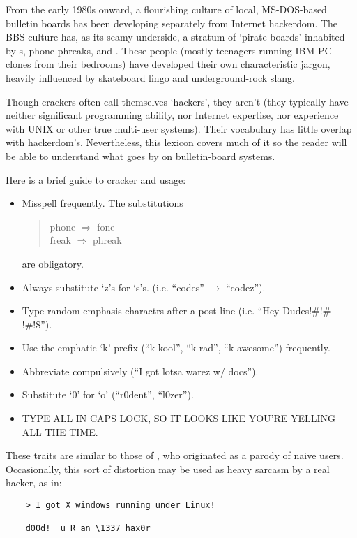 From the early 1980s onward, a flourishing culture of local, MS-DOS-based bulletin boards has been developing separately from Internet
hackerdom. The BBS culture has, as its seamy underside, a stratum of `pirate boards' inhabited by s, phone phreaks, and
. These people (mostly teenagers running IBM-PC clones from their bedrooms) have developed their own characteristic
jargon, heavily influenced by skateboard lingo and underground-rock slang.

Though crackers often call themselves `hackers', they aren't (they typically have neither significant programming ability, nor Internet
expertise, nor experience with UNIX or other true multi-user systems). Their vocabulary has little overlap with hackerdom's. Nevertheless,
this lexicon covers much of it so the reader will be able to understand what goes by on bulletin-board systems.

Here is a brief guide to cracker and  usage:

\begin{itemize}
	\item Misspell frequently. The substitutions

		\begin{quote}
			phone $\Rightarrow$ fone\\
			freak $\Rightarrow$ phreak
		\end{quote}

		are obligatory.
	\item Always substitute `z's for `s's. (i.e. ``codes'' $\rightarrow$ ``codez'').
	\item Type random emphasis charactrs after a post line (i.e. ``Hey Dudes!\#!$\#$!\#!\$'').
	\item Use the emphatic `k' prefix (``k-kool'', ``k-rad'', ``k-awesome'') frequently.
	\item Abbreviate compulsively (``I got lotsa warez w/ docs'').
	\item Substitute `0' for `o' (``r0dent'', ``l0zer'').
	\item TYPE ALL IN CAPS LOCK, SO IT LOOKS LIKE YOU'RE YELLING ALL THE TIME.
\end{itemize}

These traits are similar to those of , who originated as a parody of naive  users. Occasionally, this sort
of distortion may be used as heavy sarcasm by a real hacker, as in:

\begin{verbatim}
	> I got X windows running under Linux!

	d00d!  u R an \1337 hax0r
\end{verbatim}

